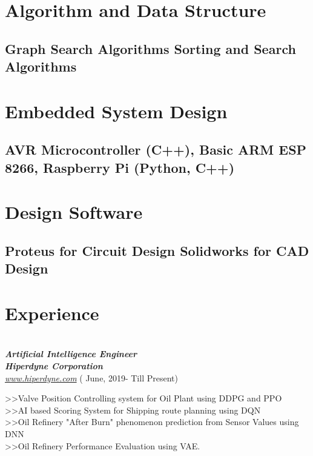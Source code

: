 \documentclass[letterpaper]{twentysecondcv} %
\begin{document}
{\section{\large Algorithm and Data Structure}\subsection{\small Graph Search Algorithms \newline Sorting and Search Algorithms}

\section{\large Embedded System Design } \subsection{\small AVR Microcontroller (C++), Basic ARM \newline ESP 8266, Raspberry Pi (Python, C++)}

\section{\large Design Software} \subsection{\small Proteus for Circuit Design \newline Solidworks for CAD Design}
}




\makeprofile %


\section{Experience}\\

{\bfseries \itshape \color{gray} Artificial Intelligence Engineer \\
Hiperdyne Corporation}\\
{ \href {www.hiperdyne.com}{\itshape \color{blue} www.hiperdyne.com}}{\color{golden}  ( June, 2019- Till Present) }\\
\begin{twentyshort}
\twentyitemshort{\color{golden} }\normalfont %
{>>Valve Position Controlling system for Oil Plant using DDPG and PPO \\
>>AI based Scoring System for Shipping route planning using DQN\\
>>Oil Refinery "After Burn" phenomenon prediction from Sensor Values using DNN\\
>>Oil Refinery Performance Evaluation using VAE.}
\end{twentyshort}
\end{document}
